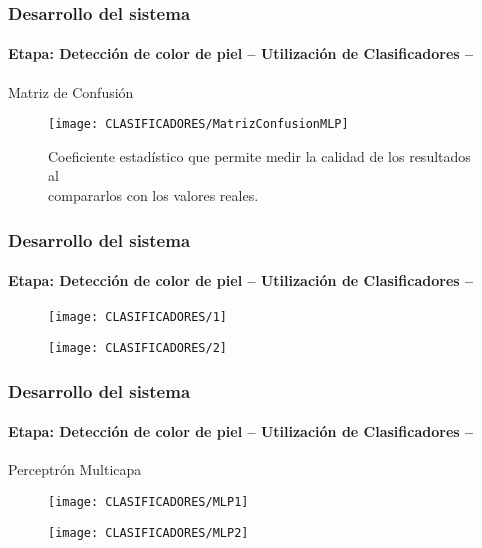 \documentclass[xcolor=dvipsnames]{beamer}
\begin{document}
	\begin{frame}
		\transdissolve
		\frametitle{Desarrollo del sistema}
		\framesubtitle{Etapa: Detección de color de piel -- Utilización de Clasificadores -- }
		Matriz de Confusión
		\begin{figure}[h]
			\centering
			\texttt{[image: CLASIFICADORES/MatrizConfusionMLP]}
			\caption{Coeficiente estadístico que permite medir la calidad de los resultados al\\
			compararlos con los valores reales.}
		\end{figure}
	\end{frame}

	\begin{frame}
		\transdissolve
		\frametitle{Desarrollo del sistema}
		\framesubtitle{Etapa: Detección de color de piel -- Utilización de Clasificadores -- }
		\begin{center}
			\begin{minipage}[c]{.45\textwidth}
				\begin{figure}[h]
					\texttt{[image: CLASIFICADORES/1]}
				\end{figure}
			\end{minipage}
			\begin{minipage}[c]{.45\textwidth}
				\begin{figure}[h]
					\texttt{[image: CLASIFICADORES/2]}
				\end{figure}
			\end{minipage}
		\end{center}
	\end{frame}	

	\begin{frame}
		\transdissolve
		\frametitle{Desarrollo del sistema}
		\framesubtitle{Etapa: Detección de color de piel -- Utilización de Clasificadores -- }
		Perceptrón Multicapa
		\begin{center}
			\begin{minipage}[c]{.45\textwidth}
				\begin{figure}[h]
					\texttt{[image: CLASIFICADORES/MLP1]}
				\end{figure}
			\end{minipage}
			\begin{minipage}[c]{.45\textwidth}
				\begin{figure}[h]
					\texttt{[image: CLASIFICADORES/MLP2]}
				\end{figure}
			\end{minipage}
		\end{center}
	\end{frame}
\end{document}
